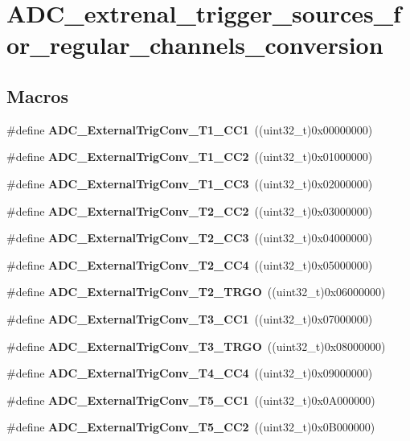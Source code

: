\section{A\+D\+C\+\_\+extrenal\+\_\+trigger\+\_\+sources\+\_\+for\+\_\+regular\+\_\+channels\+\_\+conversion}
\label{group__ADC__extrenal__trigger__sources__for__regular__channels__conversion}
\subsection*{Macros}
\begin{DoxyCompactItemize}
\item 
\#define \textbf{ A\+D\+C\+\_\+\+External\+Trig\+Conv\+\_\+\+T1\+\_\+\+C\+C1}~((uint32\+\_\+t)0x00000000)
\item 
\#define \textbf{ A\+D\+C\+\_\+\+External\+Trig\+Conv\+\_\+\+T1\+\_\+\+C\+C2}~((uint32\+\_\+t)0x01000000)
\item 
\#define \textbf{ A\+D\+C\+\_\+\+External\+Trig\+Conv\+\_\+\+T1\+\_\+\+C\+C3}~((uint32\+\_\+t)0x02000000)
\item 
\#define \textbf{ A\+D\+C\+\_\+\+External\+Trig\+Conv\+\_\+\+T2\+\_\+\+C\+C2}~((uint32\+\_\+t)0x03000000)
\item 
\#define \textbf{ A\+D\+C\+\_\+\+External\+Trig\+Conv\+\_\+\+T2\+\_\+\+C\+C3}~((uint32\+\_\+t)0x04000000)
\item 
\#define \textbf{ A\+D\+C\+\_\+\+External\+Trig\+Conv\+\_\+\+T2\+\_\+\+C\+C4}~((uint32\+\_\+t)0x05000000)
\item 
\#define \textbf{ A\+D\+C\+\_\+\+External\+Trig\+Conv\+\_\+\+T2\+\_\+\+T\+R\+GO}~((uint32\+\_\+t)0x06000000)
\item 
\#define \textbf{ A\+D\+C\+\_\+\+External\+Trig\+Conv\+\_\+\+T3\+\_\+\+C\+C1}~((uint32\+\_\+t)0x07000000)
\item 
\#define \textbf{ A\+D\+C\+\_\+\+External\+Trig\+Conv\+\_\+\+T3\+\_\+\+T\+R\+GO}~((uint32\+\_\+t)0x08000000)
\item 
\#define \textbf{ A\+D\+C\+\_\+\+External\+Trig\+Conv\+\_\+\+T4\+\_\+\+C\+C4}~((uint32\+\_\+t)0x09000000)
\item 
\#define \textbf{ A\+D\+C\+\_\+\+External\+Trig\+Conv\+\_\+\+T5\+\_\+\+C\+C1}~((uint32\+\_\+t)0x0\+A000000)
\item 
\#define \textbf{ A\+D\+C\+\_\+\+External\+Trig\+Conv\+\_\+\+T5\+\_\+\+C\+C2}~((uint32\+\_\+t)0x0\+B000000)

\end{DoxyCompactItemize}
